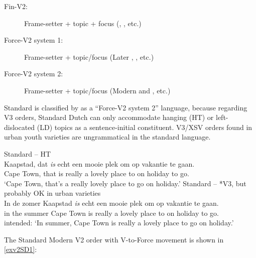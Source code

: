 \documentclass[output=paper]{langsci/langscibook}
\begin{document}
\begin{description}

    \item[Fin-V2:] Frame-setter + topic + focus (,
        , etc.)

    \item[Force-V2 system 1:] Frame-setter + topic/focus (Later
        , , etc.)

    \item[Force-V2 system 2:] Frame-setter + topic/focus
                              (Modern  and , etc.)

\end{description}

\noindent Standard  is classified by \citet{Wolfe:2017} as a
\enquote{Force-V2 system 2} language, because regarding V3 orders, Standard
Dutch can only accommodate hanging (\gls{HT}) or
left-dislocated
(\gls{LD}) topics as a sentence-initial constituent.
V3/XSV orders found in urban youth varieties are ungrammatical in the standard
language.

\ea
    \ea\label{exdisV3-ht} Standard  -- HT\\
    \gll\label{exHT-NWa}Kaapstad, dat \textit{is} echt een mooie plek om op vakantie te gaan.\\
    {Cape Town}, that is really a lovely place to on holiday to go.\Inf{}\\
    \trans \enquote*{Cape Town, that's a really lovely place to go on holiday.}
    \ex Standard  -- *V3, but probably OK in urban varieties\\
    \gll \llap{*}In de zomer Kaapstad \textit{is} echt een mooie plek om op vakantie te gaan.\\
    in the summer {Cape Town} is really a lovely place to on holiday to go.\Inf{}\\
    \trans intended: \enquote*{In summer, Cape Town is really a lovely place to go on holiday.}\label{exHT-NW2}
    \z
\z

\noindent The Standard Modern  V2 order with
V-to-Force movement is shown in \eqref{exv2SD1}:
\end{document}

